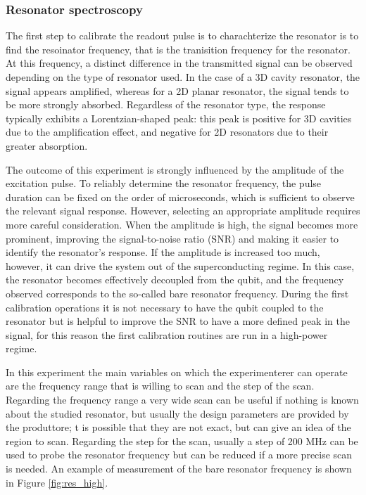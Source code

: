 \subsubsection{Resonator spectroscopy}
The first step to calibrate the readout pulse is to charachterize the resonator is to find the resoinator frequency, that is the tranisition frequency for the resonator. 
At this frequency, a distinct difference in the transmitted signal can be observed depending on the type of resonator used. 
In the case of a 3D cavity resonator, the signal appears amplified, whereas for a 2D planar resonator, the signal tends to be more strongly absorbed. Regardless of the resonator type, the response typically exhibits a Lorentzian-shaped peak: this peak is positive for 3D cavities due to the amplification effect, and negative for 2D resonators due to their greater absorption.

The outcome of this experiment is strongly influenced by the amplitude of the excitation pulse. 
To reliably determine the resonator frequency, the pulse duration can be fixed on the order of microseconds, which is sufficient to observe the relevant signal response.
However, selecting an appropriate amplitude requires more careful consideration. When the amplitude is high, the signal becomes more prominent, improving the signal-to-noise ratio (SNR) and making it easier to identify the resonator's response.
If the amplitude is increased too much, however, it can drive the system out of the superconducting regime.  
In this case, the resonator becomes effectively decoupled from the qubit, and the frequency observed corresponds to the so-called bare resonator frequency.
During the first calibration operations it is not necessary to have the qubit coupled to the resonator but is helpful to improve the SNR to have a more defined peak in the signal, for this reason the first calibration routines are run in a high-power regime.

In this experiment the main variables on which the experimenterer can operate are the frequency range that is willing to scan and the step of the scan. 
Regarding the frequency range a very wide scan can be useful if nothing is known about the studied resonator, but usually the design parameters are provided by the produttore; t is possible that they are not exact, but can give an idea of the region to scan.
Regarding the step for the scan, usually a step of 200 MHz can be used to probe the resonator frequency but can be reduced if a more precise scan is needed. 
An example of measurement of the bare resonator frequency is shown in Figure \ref{fig:res_high}.
 
